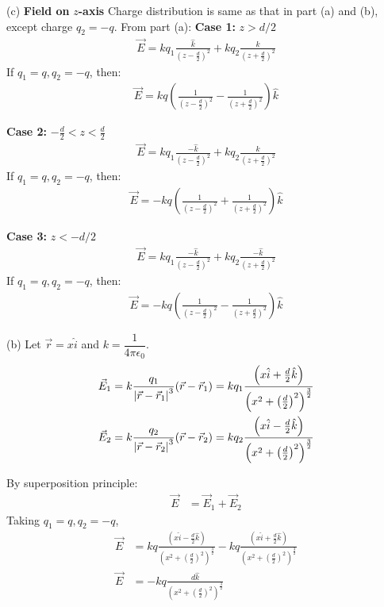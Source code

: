 \documentclass[12pt]{article}
\providecommand{\brak}[1]{\ensuremath{\left(#1\right)}}
\begin{document}
(c) \textbf{Field on} $z$\textbf{-axis}
\newline
Charge distribution is same as that in part (a) and (b), except charge $q_2 = -q$.
From part (a):
\newline
\textbf{Case 1:} $z > d/2$
\begin{align*}
\vec{E} = k q_1 \frac{\hat{k}}{\brak{z - \frac{d}{2}}^2} + k q_2 \frac{\hat{k}}{\brak{z + \frac{d}{2}}^2}
\end{align*}
If $q_1 = q, q_2 = -q$, then:
\begin{align*}
\vec{E} = k q \brak{\frac{1}{\brak{z - \frac{d}{2}}^2} - \frac{1}{\brak{z + \frac{d}{2}}^2}} \hat{k}
\end{align*}

\textbf{Case 2:} $-\frac{d}{2} < z < \frac{d}{2}$
\begin{align*}
\vec{E} = k q_1 \frac{-\hat{k}}{\brak{z - \frac{d}{2}}^2} + k q_2 \frac{\hat{k}}{\brak{z + \frac{d}{2}}^2}
\end{align*}
If $q_1 = q, q_2 = -q$, then:
\begin{align*}
\vec{E} = -kq \brak{\frac{1}{\brak{z - \frac{d}{2}}^2} + \frac{1}{\brak{z + \frac{d}{2}}^2}} \hat{k}
\end{align*}

\textbf{Case 3:} $z < -d/2$
\begin{align*}
\vec{E} = k q_1 \frac{-\hat{k}}{\brak{z - \frac{d}{2}}^2} + k q_2 \frac{-\hat{k}}{\brak{z + \frac{d}{2}}^2}
\end{align*}
If $q_1 = q, q_2 = -q$, then:
\begin{align*}
\vec{E} = -k q \brak{\frac{1}{\brak{z - \frac{d}{2}}^2} - \frac{1}{\brak{z + \frac{d}{2}}^2}} \hat{k}
\end{align*}

(b) Let $\vec{r} = x \hat{i}$ and $k = \dfrac{1}{4 \pi \epsilon_0}$.
\begin{align*}
    \vec{E}_1 = k \frac{q_1}{\abs{\vec{r} - \vec{r}_1}^3} (\vec{r} - \vec{r}_1) = k q_1\frac{\brak{x\hat{i} + \frac{d}{2}\hat{k}}}{\brak{x^2 + \brak{\frac{d}{2}}^2}^\frac{3}{2}}\\
    \vec{E}_2 = k \frac{q_2}{\abs{\vec{r} - \vec{r}_2}^3} (\vec{r} - \vec{r}_2) = k q_2\frac{\brak{x\hat{i} - \frac{d}{2}\hat{k}}}{\brak{x^2 + \brak{\frac{d}{2}}^2}^\frac{3}{2}}
\end{align*}

By superposition principle:
\begin{align*}
    \vec{E} &= \vec{E}_1 + \vec{E}_2
\end{align*}
Taking $q_1 = q, q_2 = -q$,
\begin{align*}
    \vec{E} &= kq\frac{\brak{x\hat{i} - \frac{d}{2}\hat{k}}}{\brak{x^2 + \brak{\frac{d}{2}}^2}^\frac{3}{2}} - kq\frac{\brak{x\hat{i} + \frac{d}{2}\hat{k}}}{\brak{x^2 + \brak{\frac{d}{2}}^2}^\frac{3}{2}}\\
    \vec{E} &= -kq \frac{d\hat{k}}{\brak{x^2 + \brak{\frac{d}{2}}^2}^\frac{3}{2}}
\end{align*}
\end{document}
